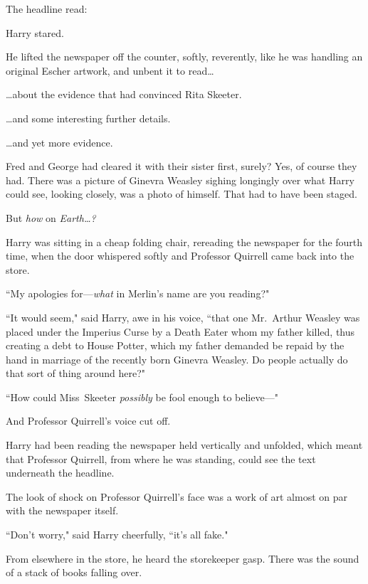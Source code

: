 The headline read:


Harry stared.

He lifted the newspaper off the counter, softly, reverently, like he was handling an original Escher artwork, and unbent it to read{\ldots}

{\ldots}about the evidence that had convinced Rita Skeeter.

{\ldots}and some interesting further details.

{\ldots}and yet more evidence.

Fred and George had cleared it with their sister first, surely? Yes, of course they had. There was a picture of Ginevra Weasley sighing longingly over what Harry could see, looking closely, was a photo of himself. That had to have been staged.

But \emph{how} on \emph{Earth{\ldots}?}

Harry was sitting in a cheap folding chair, rereading the newspaper for the fourth time, when the door whispered softly and Professor Quirrell came back into the store.

``My apologies for---\emph{what} in Merlin's name are you reading?"

``It would seem," said Harry, awe in his voice, ``that one Mr.~Arthur Weasley was placed under the Imperius Curse by a Death Eater whom my father killed, thus creating a debt to House Potter, which my father demanded be repaid by the hand in marriage of the recently born Ginevra Weasley. Do people actually do that sort of thing around here?"

``How could Miss~Skeeter \emph{possibly} be fool enough to believe---"

And Professor Quirrell's voice cut off.

Harry had been reading the newspaper held vertically and unfolded, which meant that Professor Quirrell, from where he was standing, could see the text underneath the headline.

The look of shock on Professor Quirrell's face was a work of art almost on par with the newspaper itself.

``Don't worry," said Harry cheerfully, ``it's all fake."

From elsewhere in the store, he heard the storekeeper gasp. There was the sound of a stack of books falling over.

